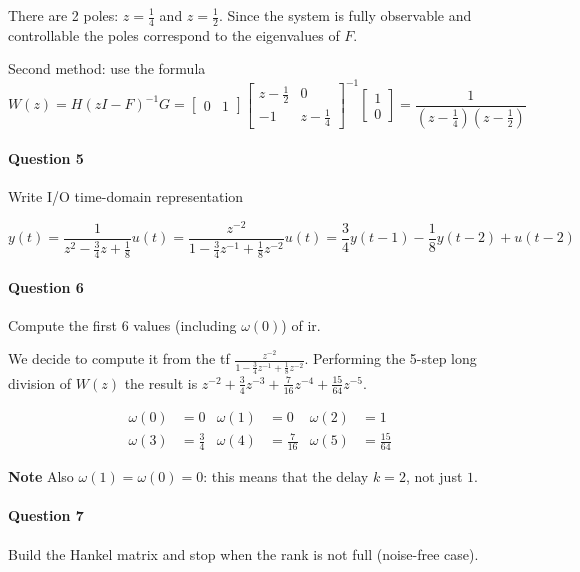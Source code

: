 \begin{example}
    There are 2 poles: $z=\frac{1}{4}$ and $z=\frac{1}{2}$. Since the system is fully observable and controllable the poles correspond to the eigenvalues of $F$.

    Second method: use the formula
    \[
        W(z) = H(zI-F)^{-1}G = \begin{bmatrix}
            0 & 1
        \end{bmatrix} \begin{bmatrix}
            z-\frac{1}{2} & 0 \\
            -1 & z-\frac{1}{4}
        \end{bmatrix}^{-1} \begin{bmatrix}
            1 \\ 0
        \end{bmatrix} = \frac{1}{(z-\frac{1}{4})(z-\frac{1}{2})}
    \]

    \paragraph{Question 5} Write I/O time-domain representation

    \[
        y(t) = \frac{1}{z^2-\frac{3}{4}z+\frac{1}{8}}u(t) = \frac{z^{-2}}{1-\frac{3}{4}z^{-1}+\frac{1}{8}z^{-2}}u(t) = \frac{3}{4}y(t-1) - \frac{1}{8}y(t-2) + u(t-2)
    \]

    \paragraph{Question 6} Compute the first 6 values (including $\omega(0)$) of \gls{ir}.

    We decide to compute it from the \gls{tf} $\frac{z^{-2}}{1-\frac{3}{4}z^{-1}+\frac{1}{8}z^{-2}}$.
    Performing the 5-step long division of $W(z)$ the result is $z^{-2}+\frac{3}{4}z^{-3}+\frac{7}{16}z^{-4}+\frac{15}{64}z^{-5}$.

    \begin{align*}
        \omega(0) &= 0 &
        \omega(1) &= 0 &
        \omega(2) &= 1 \\
        \omega(3) &= \frac{3}{4} &
        \omega(4) &= \frac{7}{16} &
        \omega(5) &= \frac{15}{64}
    \end{align*}

    \textbf{Note} Also $\omega(1)=\omega(0)=0$: this means that the delay $k=2$, not just $1$.
    
    \paragraph{Question 7} Build the Hankel matrix and stop when the rank is not full (noise-free case).


\end{example}
